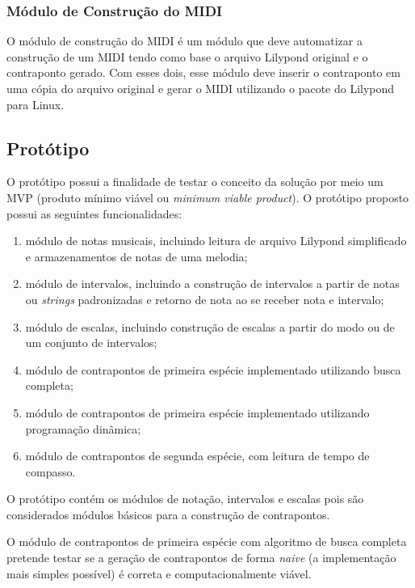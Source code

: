     \subsubsection[Módulo de Construção do MIDI]{Módulo de Construção do MIDI}

      O módulo de construção do MIDI é um módulo que deve automatizar a construção de um MIDI tendo como base o arquivo Lilypond original e o contraponto gerado. Com esses dois, esse módulo deve inserir o contraponto em uma cópia do arquivo original e gerar o MIDI utilizando o pacote do Lilypond para Linux.

  \subsection[Protótipo]{Protótipo}

    O protótipo possui a finalidade de testar o conceito da solução por meio um MVP (produto mínimo viável ou \textit{minimum viable product}). O protótipo proposto possui as seguintes funcionalidades:

    \begin{enumerate}
      \item módulo de notas musicais, incluindo leitura de arquivo Lilypond simplificado e armazenamentos de notas de uma melodia;
      \item módulo de intervalos, incluindo a construção de intervalos a partir de notas ou \textit{strings} padronizadas e retorno de nota ao se receber nota e intervalo;
      \item módulo de escalas, incluindo construção de escalas a partir do modo ou de um conjunto de intervalos;
      \item módulo de contrapontos de primeira espécie implementado utilizando busca completa;
      \item módulo de contrapontos de primeira espécie implementado utilizando programação dinâmica;
      \item módulo de contrapontos de segunda espécie, com leitura de tempo de compasso.
    \end{enumerate}

    O protótipo contém os módulos de notação, intervalos e escalas pois são considerados módulos básicos para a construção de contrapontos.

    O módulo de contrapontos de primeira espécie com algoritmo de busca completa pretende testar se a geração de contrapontos de forma \textit{naive} (a implementação mais simples possível) é correta e computacionalmente viável.

